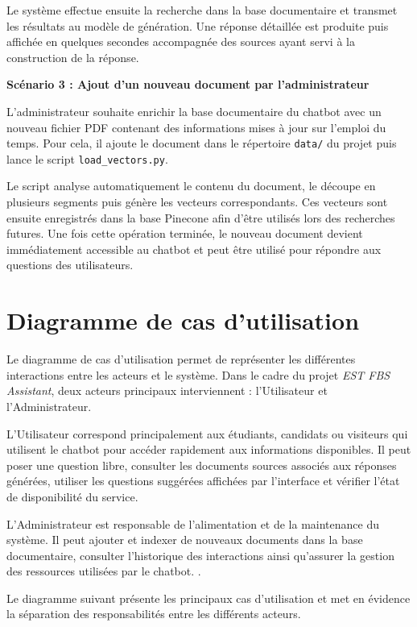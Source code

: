 \documentclass[12pt, a4paper, twoside]{report}
\begin{document}
Le système effectue ensuite la recherche dans la base documentaire et transmet les résultats au modèle de génération. Une réponse détaillée est produite puis affichée en quelques secondes accompagnée des sources ayant servi à la construction de la réponse.

\bigskip

\textbf{Scénario 3 : Ajout d'un nouveau document par l'administrateur}

L'administrateur souhaite enrichir la base documentaire du chatbot avec un nouveau fichier PDF contenant des informations mises à jour sur l'emploi du temps. Pour cela, il ajoute le document dans le répertoire \texttt{data/} du projet puis lance le script \texttt{load\_vectors.py}. 
\newline

Le script analyse automatiquement le contenu du document, le découpe en plusieurs segments puis génère les vecteurs correspondants. Ces vecteurs sont ensuite enregistrés dans la base Pinecone afin d'être utilisés lors des recherches futures. Une fois cette opération terminée, le nouveau document devient immédiatement accessible au chatbot et peut être utilisé pour répondre aux questions des utilisateurs.
\newpage
\section{ Diagramme de cas d'utilisation}


Le diagramme de cas d’utilisation permet de représenter les différentes interactions entre les acteurs et le système. Dans le cadre du projet \textit{EST FBS Assistant}, deux acteurs principaux interviennent : l’Utilisateur et l’Administrateur.

L’Utilisateur correspond principalement aux étudiants, candidats ou visiteurs qui utilisent le chatbot pour accéder rapidement aux informations disponibles. Il peut poser une question libre, consulter les documents sources associés aux réponses générées, utiliser les questions suggérées affichées par l’interface et vérifier l’état de disponibilité du service.

L’Administrateur est responsable de l’alimentation et de la maintenance du système. Il peut ajouter et indexer de nouveaux documents dans la base documentaire, consulter l’historique des interactions ainsi qu’assurer la gestion des ressources utilisées par le chatbot.
\newpage
.
\newline

Le diagramme suivant présente les principaux cas d’utilisation et met en évidence la séparation des responsabilités entre les différents acteurs.
\end{document}

